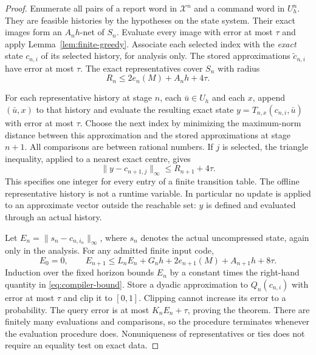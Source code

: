 \begin{proof}
Enumerate all pairs of a report word in $\mathcal X^n$ and a command
word in $U_h^n$. They are feasible histories by the hypotheses on the
state system. Their exact images form an $A_nh$-net of $S_n$.
Evaluate every image with error at most $\tau$ and apply
Lemma~\ref{lem:finite-greedy}. Associate each selected index with the
\emph{exact} state $c_{n,i}$ of its selected history, for analysis only.
The stored approximations $\widetilde c_{n,i}$ have error at most
$\tau$. The exact representatives cover $S_n$ with radius
\begin{equation}\label{eq:compiled-cover}
 R_n\le2e_n(M)+A_nh+4\tau.
\end{equation}

For each representative history at stage $n$, each $\bar u\in U_h$
and each $x$, append $(\bar u,x)$ to that history and evaluate the
resulting exact state
$y=T_{n,x}(c_{n,i},\bar u)$ with error at most $\tau$.
Choose the next index by minimizing the maximum-norm distance between
this approximation and the stored approximations at stage $n+1$.
All comparisons are between rational numbers. If $j$ is selected, the
triangle inequality, applied to a nearest exact centre, gives
\[
 \|y-c_{n+1,j}\|_\infty\le R_{n+1}+4\tau.
\]
This specifies one integer for every entry of a finite transition table.
The offline representative history is not a runtime variable. In
particular no update is applied to an approximate vector outside the
reachable set: $y$ is defined and evaluated through an actual history.

Let $E_n=\|s_n-c_{n,i_n}\|_\infty$, where $s_n$ denotes the actual
uncompressed state, again only in the analysis. For any admitted finite
input code,
\begin{equation}\label{eq:digital-recurrence}
 E_0=0,\qquad
 E_{n+1}\le L_nE_n+G_nh+2e_{n+1}(M)+A_{n+1}h+8\tau.
\end{equation}
Induction over the fixed horizon bounds $E_n$ by a constant times the
right-hand quantity in \eqref{eq:compiler-bound}. Store a dyadic
approximation to $Q_n(c_{n,i})$ with error at most $\tau$ and clip it
to $[0,1]$. Clipping cannot increase its error to a probability.
The query error is at most $K_nE_n+\tau$, proving the theorem.
There are finitely many evaluations and comparisons, so the procedure
terminates whenever the evaluation procedure does. Nonuniqueness of
representatives or ties does not require an equality test on exact data.
\end{proof}

